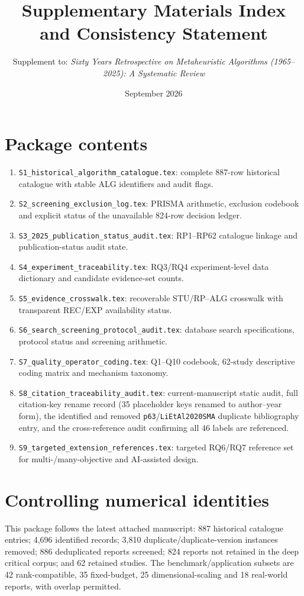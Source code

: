 \documentclass[10pt]{article}
\title{Supplementary Materials Index and Consistency Statement}
\author{Supplement to: \textit{Sixty Years Retrospective on Metaheuristic Algorithms (1965--2025): A Systematic Review}}
\date{September 2026}
\begin{document}
\maketitle
\section*{Package contents}
\begin{enumerate}
\item \texttt{S1\_historical\_algorithm\_catalogue.tex}: complete 887-row historical catalogue with stable ALG identifiers and audit flags.
\item \texttt{S2\_screening\_exclusion\_log.tex}: PRISMA arithmetic, exclusion codebook and explicit status of the unavailable 824-row decision ledger.
\item \texttt{S3\_2025\_publication\_status\_audit.tex}: RP1--RP62 catalogue linkage and publication-status audit state.
\item \texttt{S4\_experiment\_traceability.tex}: RQ3/RQ4 experiment-level data dictionary and candidate evidence-set counts.
\item \texttt{S5\_evidence\_crosswalk.tex}: recoverable STU/RP--ALG crosswalk with transparent REC/EXP availability status.
\item \texttt{S6\_search\_screening\_protocol\_audit.tex}: database search specifications, protocol status and screening arithmetic.
\item \texttt{S7\_quality\_operator\_coding.tex}: Q1--Q10 codebook, 62-study descriptive coding matrix and mechanism taxonomy.
\item \texttt{S8\_citation\_traceability\_audit.tex}: current-manuscript static audit, full citation-key rename record (35 placeholder keys renamed to author--year form), the identified and removed \texttt{p63}/\texttt{LiEtAl2020SMA} duplicate bibliography entry, and the cross-reference audit confirming all 46 labels are referenced.
\item \texttt{S9\_targeted\_extension\_references.tex}: targeted RQ6/RQ7 reference set for multi-/many-objective and AI-assisted design.
\end{enumerate}

\section*{Controlling numerical identities}
This package follows the latest attached manuscript: 887 historical catalogue entries; 4,696 identified records; 3,810 duplicate/duplicate-version instances removed; 886 deduplicated reports screened; 824 reports not retained in the deep critical corpus; and 62 retained studies. The benchmark/application subsets are 42 rank-compatible, 35 fixed-budget, 25 dimensional-scaling and 18 real-world reports, with overlap permitted.
\end{document}

